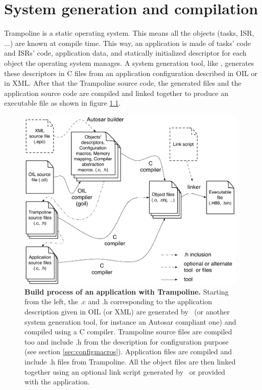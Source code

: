 
\chapter{System generation and compilation}

Trampoline is a static operating system. This means all the objects (tasks, ISR, ...) are known at compile time. This way, an application is made of tasks' code and ISRs' code, application data, and statically initialized descriptor for each object the operating system manages. A system generation tool, like \goil, generates these descriptors in C files from an application configuration described in OIL or in XML. After that the Trampoline source code, the generated files and the application source code are compiled and linked together to produce an executable file as shown in figure \ref{fig:buildtrampoline}.

\begin{figure}[htbp] %
   \centering
   \includegraphics[width=4.3in]{pictures/buildProcess.pdf} 
   \caption{\textbf{Build process of an application with Trampoline.} Starting from the left, the .c and .h corresponding to the application description given in OIL (or XML) are generated by \goil\ (or another system generation tool, for instance an Autosar compliant one) and compiled using a C compiler. Trampoline source files are compiled too and include .h from the description for configuration purpose (see section \ref{sec:configmacros}). Application files are compiled and include .h files from Trampoline. All the object files are then linked together using an optional link script generated by \goil\ or provided with the application.}\label{fig:buildtrampoline}
\end{figure}

